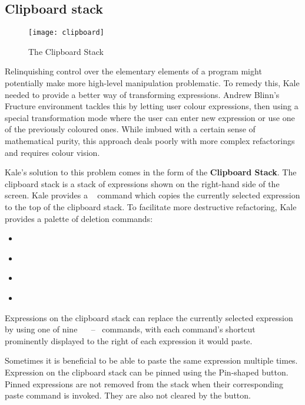 \needspace{7cm}
\subsection{Clipboard stack}
\label{soln:clipboard_list}
\begin{wrapfigure}[15]{R}{0pt}
	\texttt{[image: clipboard]}
	\caption{The Clipboard Stack}
\end{wrapfigure}

Relinquishing control over the elementary elements of a program might
potentially make more high-level manipulation problematic. To remedy this,
Kale needed to provide a better way of transforming expressions. Andrew Blinn's
Fructure \cite{Fructure} environment tackles this by letting user colour
expressions, then
using a special transformation mode where the user can enter new expression or
use one of the previously coloured ones. While imbued with a certain sense of
mathematical purity, this approach deals poorly with more complex refactorings
and requires colour vision.

Kale's solution to this problem comes in the form of the \textbf{Clipboard Stack}. The
clipboard stack is a stack of expressions shown on the right-hand side of the
screen. Kale provides a \hyperref[cmd:copy]{}~ command which
copies the currently
selected expression to the top of the clipboard stack. To facilitate more
destructive refactoring, Kale provides a palette of deletion commands:

\begin{itemize}[noitemsep]
	\item \hyperref[cmd:delete]{} \keys{\backspace}
	\item \hyperref[cmd:cut]{} 
	\item \hyperref[cmd:delete_blank]{} 
	\item \hyperref[cmd:cut_blank]{} 
\end{itemize}

Expressions on the clipboard stack can replace the currently selected
expression by using one of nine \hyperref[cmd:paste]{}~
~--~ commands, with each command's shortcut prominently
displayed to the right of each expression it would paste.

Sometimes it is beneficial to be able to paste the same expression multiple
times. Expression on the clipboard stack can be pinned using the Pin-shaped
button. Pinned expressions are not removed from the stack when their
corresponding paste command is invoked.
They are also not cleared by the  button.

